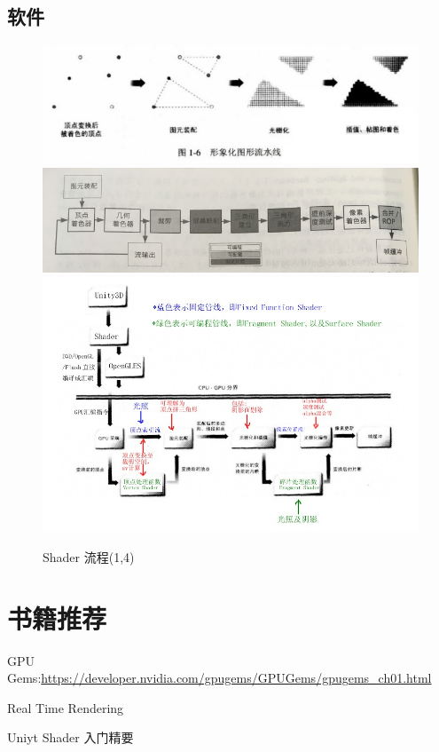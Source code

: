\documentclass[UTF8,a4paper,12pt]{ctexbook}
\begin{document}
	\section{软件}   
		\begin{figure}[H]
			\centering
			\includegraphics[scale=0.59]{ShaderPro}
			\includegraphics[scale=0.69]{ShaderProc}
			\includegraphics[scale=0.59]{ShaderPro2}
			\caption{Shader 流程(1,4)}
		\end{figure}
	
	
\chapter{书籍推荐}
	
	GPU Gems:\url{https://developer.nvidia.com/gpugems/GPUGems/gpugems_ch01.html}
	
	Real Time Rendering
	
	Uniyt Shader 入门精要
	
\end{document}
